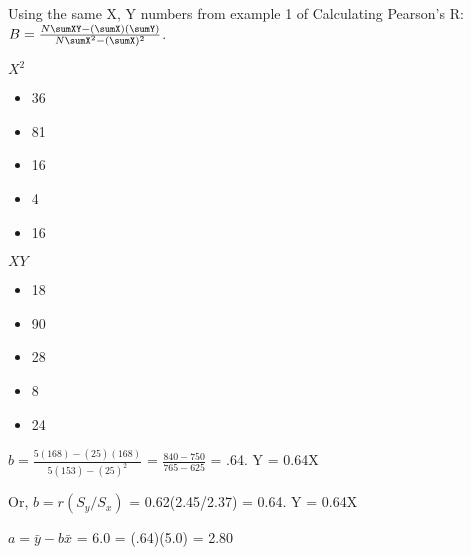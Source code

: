 \documentclass[11pt]{report}
\begin{document}
\newpage
{}
{
    Using the same X, Y numbers from example 1 of Calculating Pearson's R: \newline\newline
    $B = \frac{N\sumXY-(\sumX)(\sumY)}{N\sumX^2 - (\sumX)^2}$. \newline

    \begin{multicols}{2}
        $X^2$
        \begin{itemize}
            \item 36
            \item 81
            \item 16
            \item 4
            \item 16
        \end{itemize}   
        \columnbreak
        $XY$
        \begin{itemize}
            \item 18
            \item 90
            \item 28
            \item 8
            \item 24
        \end{itemize}
    \end{multicols}

    $b = \frac{5(168) - (25)(168)}{5(153) - (25)^2}$ = $\frac{840 - 750}{765 - 625}$ = .64. \newline\newline
    Y = 0.64X \newline
    
    Or, $b = r(S_y/S_x)$ = 0.62(2.45/2.37) = 0.64. \newline\newline
    Y = 0.64X \newline

    $a = \bar{y} - b\bar{x}$ = 6.0 = (.64)(5.0) = 2.80 \newline

}
\end{document}
